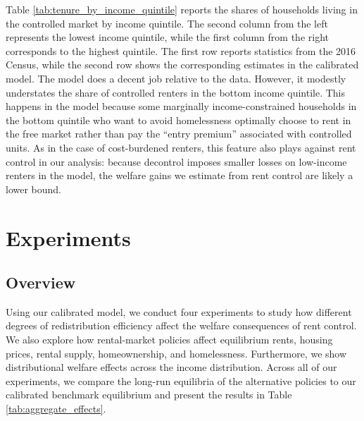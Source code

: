 \documentclass[parskip=full]{article}
\begin{document}
Table \ref{tab:tenure_by_income_quintile} reports the shares of households living in the controlled market by income quintile. The second column from the left represents the lowest income quintile, while the first column from the right corresponds to the highest quintile. The first row reports statistics from the 2016 Census, while the second row shows the corresponding estimates in the calibrated model. The model does a decent job relative to the data. However, it modestly understates the share of controlled renters in the bottom income quintile. This happens in the model because some marginally income-constrained households in the bottom quintile who want to avoid homelessness optimally choose to rent in the free market rather than pay the ``entry premium'' associated with controlled units. As in the case of cost-burdened renters, this feature also plays against rent control in our analysis: because decontrol imposes smaller losses on low-income renters in the model, the welfare gains we estimate from rent control are likely a lower bound.

\section{Experiments}\label{section:experiments}

\subsection{Overview}\label{sec:overview_experiments}

Using our calibrated model, we conduct four experiments to study how different degrees of redistribution efficiency affect the welfare consequences of rent control. We also explore how rental-market policies affect equilibrium rents, housing prices, rental supply, homeownership, and homelessness. Furthermore, we show distributional welfare effects across the income distribution. Across all of our experiments, we compare the long-run equilibria of the alternative policies to our calibrated benchmark equilibrium and present the results in Table \ref{tab:aggregate_effects}.
\end{document}
